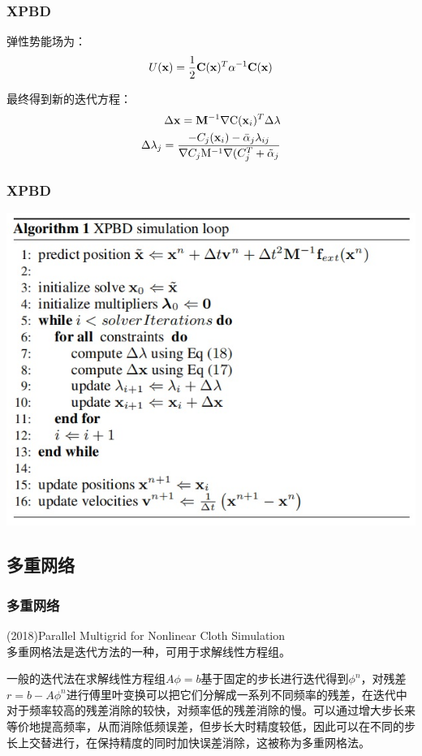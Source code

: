 \documentclass[aspectratio=43]{ctexbeamer}
\begin{document}
\begin{frame}
  \frametitle{XPBD}
		\; \;弹性势能场为：
       \begin{equation}
			U({\bf x})={\frac{1}{2}}{\bf C}({\bf x})^{T}\alpha^{-1}{\bf C}({\bf x})
		\end{equation}

		\; \;最终得到新的迭代方程：
       \begin{equation}
		\begin{split}
			\Delta{\bf x}={\bf M}^{-1}\nabla\mathrm{C}({\bf x}_{i})^{T}\Delta\lambda \\
			\Delta\lambda_{j}=\frac{-C_{j}({\bf x}_{i})-\bar{\alpha}_{j}\lambda_{i j}}{\nabla C_{j}\mathrm{M}^{-1}\nabla(C_{j}^{T}+\tilde{\alpha}_{j}}
		\end{split}
		\end{equation}
\end{frame}



\begin{frame}
  \frametitle{XPBD}
        \begin{center}
            \includegraphics[width=0.8\linewidth]{./fig/XPBD算法.jpg}
        \end{center}
\end{frame}

\subsection{多重网络}
\begin{frame}
  \frametitle{多重网络}
	(2018)Parallel Multigrid for Nonlinear Cloth Simulation\\[10pt]

		\; \;多重网格法是迭代方法的一种，可用于求解线性方程组。

		\; \;一般的迭代法在求解线性方程组$A\phi=b$基于固定的步长进行迭代得到$\phi ^n$，对残差$r=b-A\phi^{n}$进行傅里叶变换可以把它们分解成一系列不同频率的残差，在迭代中对于频率较高的残差消除的较快，对频率低的残差消除的慢。可以通过增大步长来等价地提高频率，从而消除低频误差，但步长大时精度较低，因此可以在不同的步长上交替进行，在保持精度的同时加快误差消除，这被称为多重网格法。
\end{frame}
\end{document}
